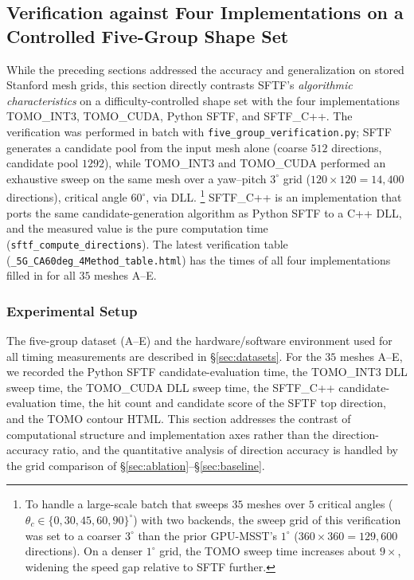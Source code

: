 \documentclass[11pt,a4paper]{article}
\begin{document}
\subsection{Verification against Four Implementations on a Controlled Five-Group Shape Set}
\label{sec:fivegroup}

While the preceding sections addressed the accuracy and generalization on stored Stanford mesh grids,
this section directly contrasts SFTF's \emph{algorithmic characteristics} on a difficulty-controlled shape set
with the four implementations TOMO\_INT3, TOMO\_CUDA, Python SFTF, and SFTF\_C++.
The verification was performed in batch with \texttt{five\_group\_verification.py};
SFTF generates a candidate pool from the input mesh alone (coarse $512$ directions, candidate pool $1292$),
while TOMO\_INT3 and TOMO\_CUDA performed an exhaustive sweep on the same mesh over a yaw--pitch $3^\circ$ grid
($120\times120=14{,}400$ directions), critical angle $60^\circ$, via DLL.%
\footnote{To handle a large-scale batch that sweeps $35$ meshes over $5$ critical angles ($\theta_c\in\{0,30,45,60,90\}^\circ$) with two backends,
the sweep grid of this verification was set to a coarser $3^\circ$ than the prior GPU-MSST's $1^\circ$
($360\times360=129{,}600$ directions). On a denser $1^\circ$ grid, the TOMO sweep time increases about $9\times$, widening the speed gap relative to SFTF further.}
SFTF\_C++ is an implementation that ports the same candidate-generation algorithm as Python SFTF to a C++ DLL,
and the measured value is the pure computation time (\texttt{sftf\_compute\_directions}).
The latest verification table (\texttt{\_5G\_CA60deg\_4Method\_table.html}) has the times of all four implementations filled in for all $35$ meshes A--E.

\subsubsection{Experimental Setup}

The five-group dataset (A--E) and the hardware/software environment used for all timing measurements are described in \S\ref{sec:datasets}.
For the $35$ meshes A--E, we recorded the Python SFTF candidate-evaluation time,
the TOMO\_INT3 DLL sweep time, the TOMO\_CUDA DLL sweep time, the SFTF\_C++ candidate-evaluation time,
the hit count and candidate score of the SFTF top direction, and the TOMO contour HTML.
This section addresses the contrast of computational structure and implementation axes rather than the direction-accuracy ratio,
and the quantitative analysis of direction accuracy is handled by the grid comparison of \S\ref{sec:ablation}--\S\ref{sec:baseline}.
\end{document}

